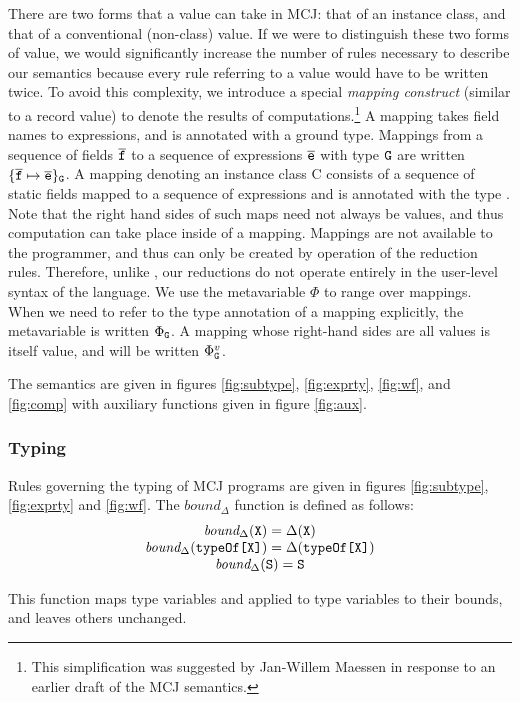 \documentclass[10pt]{acm-sigplan}
\begin{document}
There are two forms that a value can take in MCJ: that of an instance
class, and that of a conventional (non-class) value. If we were to
distinguish these two forms of value, we would significantly increase
the number of rules necessary to describe our semantics because every
rule referring to a value would have to be written twice. To avoid
this complexity, we introduce a special {\em mapping construct}
(similar to a record value) to denote the results of
computations.\footnote{This simplification was suggested by Jan-Willem
Maessen in response to an earlier draft of the MCJ semantics.}  A
mapping takes field names to expressions, and is annotated with a
ground type. Mappings from a sequence of fields ${\overline{{\mbox {\tt f}}}}$ to a sequence of
expressions ${\overline{{\mbox {\tt e}}}}$ with type $\mathtt{{G}}$ are written $\{{{\overline{{\mbox {\tt f}}}}} \mapsto {\ensuremath {{\overline{{\mbox {\tt e}}}}}}\}_{\mathtt{{G}}}$.
A mapping denoting an instance class {\txt C} consists of a sequence
of static fields mapped to a sequence of expressions and is annotated
with the type \typeof{\C}. Note that the right hand sides of such
maps need not always be values, and thus computation can take place
inside of a mapping.  Mappings are not available to the programmer,
and thus can only be created by operation of the reduction rules.
Therefore, unlike \FJ, our reductions do not operate entirely in the
user-level syntax of the language.  We use the metavariable $\Phi$ to
range over mappings.  When we need to refer to the type annotation of
a mapping explicitly, the metavariable is written $\Phi_{\mathtt{{G}}}$.  A
mapping whose right-hand sides are all values is itself value, and
will be written $\Phi_{\mathtt{{G}}}^v$.  

The semantics are given in figures \ref{fig:subtype},
\ref{fig:exprty}, \ref{fig:wf}, and \ref{fig:comp} with auxiliary
functions given in figure \ref{fig:aux}.


\subsubsection{Typing}
Rules governing the typing of MCJ programs are given in figures
\ref{fig:subtype}, \ref{fig:exprty} and \ref{fig:wf}.  The
$bound_{\Delta}$ function is defined as follows:
\begin{displaymath}
\begin{array}{c}
\mbox{\it bound}_{\Delta}(\mbox {\tt X}) = \Delta(\mbox {\tt X}) \\
\mbox{\it bound}_{\Delta}({\mathtt{{typeOf}}{\mbox{\tt [}}\mbox {\tt X}\mbox{{\tt ]}}}) = \Delta({\mathtt{{typeOf}}{\mbox{\tt [}}\mbox {\tt X}\mbox{{\tt ]}}}) \\
\mbox{\it bound}_{\Delta}(\mbox {\tt S}) = \mbox {\tt S}
\end{array}
\end{displaymath}

This function maps type variables and {} applied to type
variables to their bounds, and leaves others unchanged.
\end{document}
